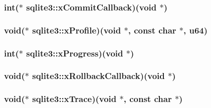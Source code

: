 \hypertarget{structsqlite3_a1b12d797fb7f9c526ffb6665a7f42203}{
\subsubsection[{x\-Commit\-Callback}]{\setlength{\rightskip}{0pt plus 5cm}int($\ast$ sqlite3\-::x\-Commit\-Callback)(void $\ast$)}}\label{structsqlite3_a1b12d797fb7f9c526ffb6665a7f42203}
\hypertarget{structsqlite3_aa02bf4f3ffdaf52d43a3668661903ffb}{
\subsubsection[{x\-Profile}]{\setlength{\rightskip}{0pt plus 5cm}void($\ast$ sqlite3\-::x\-Profile)(void $\ast$, const char $\ast$, {\bf u64})}}\label{structsqlite3_aa02bf4f3ffdaf52d43a3668661903ffb}
\hypertarget{structsqlite3_aa691b02e7878f45a7c2b59a70e9c5ef3}{
\subsubsection[{x\-Progress}]{\setlength{\rightskip}{0pt plus 5cm}int($\ast$ sqlite3\-::x\-Progress)(void $\ast$)}}\label{structsqlite3_aa691b02e7878f45a7c2b59a70e9c5ef3}
\hypertarget{structsqlite3_ad09cbc96e3c4e322c1722b8c16b9cf24}{
\subsubsection[{x\-Rollback\-Callback}]{\setlength{\rightskip}{0pt plus 5cm}void($\ast$ sqlite3\-::x\-Rollback\-Callback)(void $\ast$)}}\label{structsqlite3_ad09cbc96e3c4e322c1722b8c16b9cf24}
\hypertarget{structsqlite3_ae438713860c36ad393eb28702b67fec5}{
\subsubsection[{x\-Trace}]{\setlength{\rightskip}{0pt plus 5cm}void($\ast$ sqlite3\-::x\-Trace)(void $\ast$, const char $\ast$)}}\label{structsqlite3_ae438713860c36ad393eb28702b67fec5}
